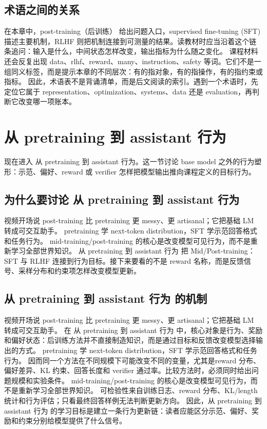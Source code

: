 \documentclass[a4paper]{article}
\begin{document}
\subsection{术语之间的关系}
在本章中，post-training（后训练） 给出问题入口，supervised fine-tuning (SFT) 描述主要机制，RLHF 则把机制连接到可测量的结果。读教材时应当沿着这个链条追问：输入是什么，中间状态怎样改变，输出指标为什么随之变化。
课程材料还会反复出现 data、rlhf、reward、many、instruction、safety 等词。它们不是一组同义标签，而是提示本章的不同层次：有的指对象，有的指操作，有的指约束或指标。
因此，术语表不是背诵清单，而是后文阅读的索引。遇到一个术语时，先定位它属于 representation、optimization、systems、data 还是 evaluation，再判断它改变哪一项账本。
\section{从 pretraining 到 assistant 行为}
现在进入 从 pretraining 到 assistant 行为。这一节讨论 base model 之外的行为塑形：示范、偏好、reward 或 verifier 怎样把模型输出推向课程定义的目标行为。
\subsection{为什么要讨论 从 pretraining 到 assistant 行为}
视频开场说 post-training 比 pretraining 更 messy、更 artisanal；它把基础 LM 转成可交互助手。
pretraining 学 next-token distribution，SFT 学示范回答格式和任务行为。
mid-training/post-training 的核心是改变模型可见行为，而不是重新学习全部世界知识。
从 pretraining 到 assistant 行为 把 Mid/Post-training：SFT 与 RLHF 连接到行为目标。接下来要看的不是 reward 名称，而是反馈信号、采样分布和约束项怎样改变模型更新。
\subsection{从 pretraining 到 assistant 行为 的机制}
视频开场说 post-training 比 pretraining 更 messy、更 artisanal；它把基础 LM 转成可交互助手。 在 从 pretraining 到 assistant 行为 中，核心对象是行为、奖励和偏好状态：后训练方法并不直接制造知识，而是通过目标和反馈改变模型选择输出的方式。
pretraining 学 next-token distribution，SFT 学示范回答格式和任务行为。 因而同一个方法在不同规模下可能改变不同的变量，尤其是reward 分布、偏好差异、KL 约束、回答长度和 verifier 通过率。比较方法时，必须同时给出问题规模和实验条件。
mid-training/post-training 的核心是改变模型可见行为，而不是重新学习全部世界知识。 可检验性来自训练日志、reward 分布、KL/length 统计和行为评估；只看最终回答样例无法判断更新方向。
因此，从 pretraining 到 assistant 行为 的学习目标是建立一条行为更新链：读者应能区分示范、偏好、奖励和约束分别给模型提供了什么信号。
\end{document}
